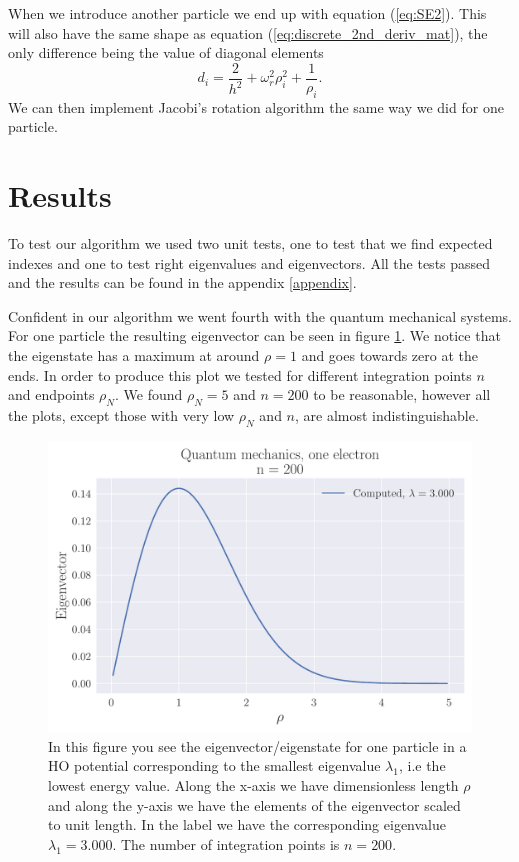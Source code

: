 \documentclass[reprint,english,notitlepage,nofootinbib]{revtex4-1}  %
\begin{document}
When we introduce another particle we end up with equation (\ref{eq:SE2}). This will also have the same shape as equation (\ref{eq:discrete_2nd_deriv_mat}), the only difference being the value of diagonal elements
\begin{equation*}
	d_i = \frac{2}{h^2} + \omega_r^2\rho_i^2 + \frac{1}{\rho_i}.
\end{equation*}
We can then implement Jacobi's rotation algorithm the same way we did for one particle.

\section{Results}

To test our algorithm we used two unit tests, one to test that we find expected indexes and one to test right eigenvalues and eigenvectors. All the tests passed and the results can be found in the appendix \ref{appendix}.

Confident in our algorithm we went fourth with the quantum mechanical systems. For one particle the resulting eigenvector can be seen in figure \ref{fig:QM200}. We notice that the eigenstate has a maximum at around $\rho = 1$ and goes towards zero at the ends. In order to produce this plot we tested for different integration points $n$ and endpoints $\rho_N$. We found $\rho_N= 5$ and $n=200$ to be reasonable, however all the plots, except those with very low $\rho_N$ and $n$, are almost indistinguishable.

\begin{figure}[h]
	\centering
	\includegraphics[width=\linewidth]{../output/QM1_200_0.pdf}
	\caption{In this figure you see the eigenvector/eigenstate for one particle in a HO potential corresponding to the smallest eigenvalue $\lambda_1$, i.e the lowest energy value. Along the x-axis we have dimensionless length $\rho$ and along the y-axis we have the elements of the eigenvector scaled to unit length. In the label we have the corresponding eigenvalue $\lambda_1 = 3.000$. The number of integration points is $n = 200$.}
  \label{fig:QM200}
\end{figure}
\end{document}
